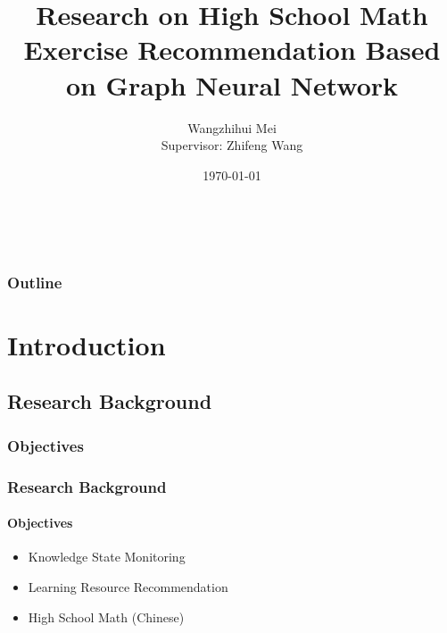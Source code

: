 \documentclass{beamer}
\title[Exercise Recommendation]{Research on High School Math Exercise Recommendation Based on Graph Neural Network} %
\author{Wangzhihui Mei\\ Supervisor: Zhifeng Wang} %
\institute[CCNU-UOW JI] 
{
  Central China Normal University Wollongong Joint Institute \\ %
}
\date{\today} %
\begin{document}
\begin{frame}
	\titlepage\ %
\end{frame}

\begin{frame}
	\frametitle{Outline} %
	\tableofcontents %
\end{frame}


\section{Introduction}
\subsection{Research Background}
\subsubsection{Objectives}
\begin{frame}
	\frametitle{Research Background}
	\framesubtitle{Objectives}
	\begin{itemize}
		\item Knowledge State Monitoring
		\item Learning Resource Recommendation
		\item High School Math (Chinese)
	\end{itemize}
\end{frame}

\end{document}
